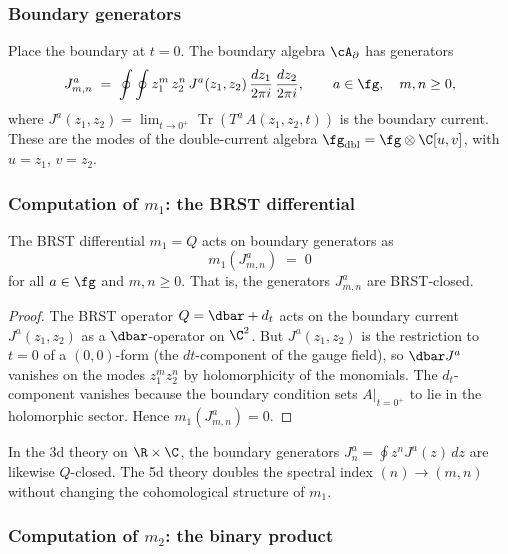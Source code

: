 \subsubsection{Boundary generators}

Place the boundary at $t = 0$. The boundary algebra
$\cA_\partial$ has generators
\[
 J^a_{m,n}
 \;=\;
 \oint\oint
 z_1^m\, z_2^n\, J^a(z_1,z_2)\,
 \frac{dz_1}{2\pi i}\, \frac{dz_2}{2\pi i},
 \qquad a \in \fg,\quad m,n \ge 0,
\]
where $J^a(z_1,z_2) = \lim_{t\to 0^+}
\operatorname{Tr}(T^a\, A(z_1,z_2,t))$ is the
boundary current. These are the modes of the
double-current algebra
$\fg_{\mathrm{dbl}} = \fg\otimes\C[u,v]$,
with $u = z_1$, $v = z_2$.

\subsubsection{Computation of \texorpdfstring{$m_1$}{m1}: the BRST differential}

\begin{proposition}
\label{prop:DDCA-m1}
The BRST differential $m_1 = Q$ acts on boundary generators
as
\[
 m_1(J^a_{m,n}) \;=\; 0
\]
for all $a \in \fg$ and $m,n \ge 0$. That is, the
generators $J^a_{m,n}$ are BRST-closed.
\end{proposition}

\begin{proof}
The BRST operator $Q = \dbar + d_t$ acts on the
boundary current $J^a(z_1,z_2)$ as a $\dbar$-operator on
$\C^2$. But $J^a(z_1,z_2)$ is the restriction to $t=0$
of a $(0,0)$-form (the $dt$-component of the gauge field),
so $\dbar J^a$ vanishes on the modes $z_1^m z_2^n$ by
holomorphicity of the monomials. The $d_t$-component
vanishes because the boundary condition sets
$A|_{t=0^+}$ to lie in the holomorphic sector. Hence
$m_1(J^a_{m,n}) = 0$.
\end{proof}

\begin{remark}
In the 3d theory on $\R\times\C$, the boundary generators
$J^a_n = \oint z^n J^a(z)\,dz$ are likewise $Q$-closed.
The 5d theory doubles the spectral index
$(n) \to (m,n)$ without changing the cohomological
structure of $m_1$.
\end{remark}

\subsubsection{Computation of \texorpdfstring{$m_2$}{m2}: the binary product}

